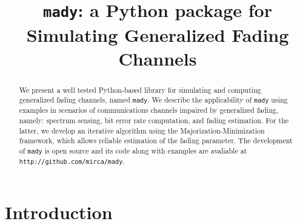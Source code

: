 \documentclass[conference, 10pt]{IEEEtran}
\begin{document}
\title{\texttt{mady}: a Python package for Simulating Generalized Fading Channels}

\author{
}

\maketitle

\begin{abstract}
    We present a well tested Python-based library for simulating and computing
    generalized fading channels, named \texttt{mady}. We describe the
    applicability of \texttt{mady} using examples in scenarios of communications
    channels impaired by generalized fading, namely: spectrum sensing, bit error
    rate computation, and fading estimation. For the latter, we develop an iterative
    algorithm using the Majorization-Minimization framework, which allows reliable
    estimation of the fading parameter. The development of \texttt{mady} is open
    source and its code along with examples are avaliable at
    \texttt{http://github.com/mirca/mady}.
\end{abstract}

\IEEEpeerreviewmaketitle
\section{Introduction}
\end{document}
